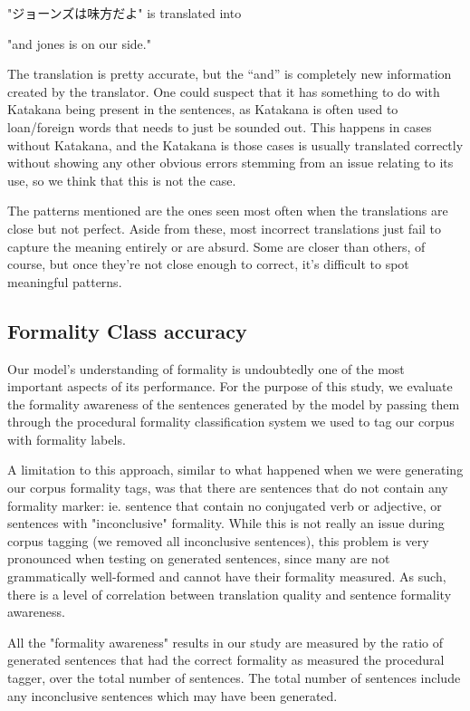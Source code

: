 \documentclass[11pt]{article}
\begin{document}
"ジョーンズは味方だよ" is translated into

"and jones is on our side."

The translation is pretty accurate, but the “and” is completely new information created by the translator. One could suspect that it has something to do with Katakana being present in the sentences, as Katakana is often used to loan/foreign words that needs to just be sounded out. This happens in cases without Katakana, and the Katakana is those cases is usually translated correctly without showing any other obvious errors stemming from an issue relating to its use, so we think that this is not the case. 

The patterns mentioned are the ones seen most often when the translations are close but not perfect. Aside from these, most incorrect translations just fail to capture the meaning entirely or are absurd. Some are closer than others, of course, but once they’re not close enough to correct, it’s difficult to spot meaningful patterns.

\subsection{Formality Class accuracy}

Our model's understanding of formality is undoubtedly one of the most important aspects of its performance. For the purpose of this study, we evaluate the formality awareness of the sentences generated by the model by passing them through the procedural formality classification system we used to tag our corpus with formality labels.

A limitation to this approach, similar to what happened when we were generating our corpus formality tags, was that there are sentences that do not contain any formality marker: ie. sentence that contain no conjugated verb or adjective, or sentences with "inconclusive" formality. While this is not really an issue during corpus tagging (we removed all inconclusive sentences), this problem is very pronounced when testing on generated sentences, since many are not grammatically well-formed and cannot have their formality measured. As such, there is a level of correlation between translation quality and sentence formality awareness.

All the "formality awareness" results in our study are measured by the ratio of generated sentences that had the correct formality as measured the procedural tagger, over the total number of sentences. The total number of sentences include any inconclusive sentences which may have been generated. 
\end{document}
